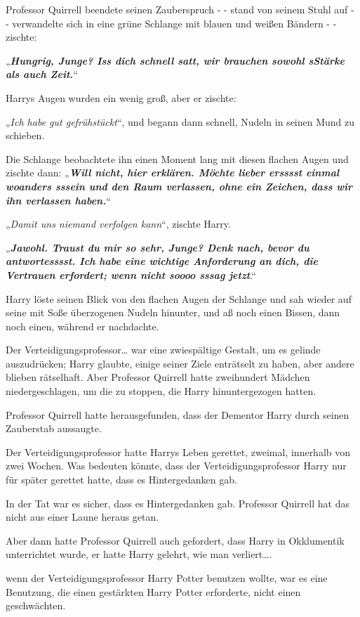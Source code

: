 {Professor Quirrell beendete seinen Zauberspruch - - stand von seinem Stuhl auf - - verwandelte sich in eine grüne Schlange mit blauen und weißen Bändern - - zischte:

„\textbf{\emph{Hungrig, Junge? Iss dich schnell satt, wir brauchen sowohl sStärke als auch Zeit.}}“

Harrys Augen wurden ein wenig groß, aber er zischte:

„\emph{Ich habe gut gefrühstückt}“, und begann dann schnell, Nudeln in seinen Mund zu schieben.

Die Schlange beobachtete ihn einen Moment lang mit diesen flachen Augen und zischte dann: „\textbf{\emph{Will nicht, hier erklären. Möchte lieber ersssst einmal woanders sssein und den Raum verlassen, ohne ein Zeichen, dass wir ihn verlassen haben.}}“

„\emph{Damit uns niemand verfolgen kann}“, zischte Harry.

„\textbf{\emph{Jawohl. Traust du mir so sehr, Junge? Denk nach, bevor du antwortesssst. Ich habe eine wichtige Anforderung an dich, die Vertrauen erfordert; wenn nicht soooo sssag jetzt}}.“

Harry löste seinen Blick von den flachen Augen der Schlange und sah wieder auf seine mit Soße überzogenen Nudeln hinunter, und aß noch einen Bissen, dann noch einen, während er nachdachte.

Der Verteidigungsprofessor… war eine zwiespältige Gestalt, um es gelinde auszudrücken; Harry glaubte, einige seiner Ziele enträtselt zu haben, aber andere blieben rätselhaft. Aber Professor Quirrell hatte zweihundert Mädchen niedergeschlagen, um die zu stoppen, die Harry hinuntergezogen hatten.

Professor Quirrell hatte herausgefunden, dass der Dementor Harry durch seinen Zauberstab aussaugte.

Der Verteidigungsprofessor hatte Harrys Leben gerettet, zweimal, innerhalb von zwei Wochen. Was bedeuten könnte, dass der Verteidigungsprofessor Harry nur für später gerettet hatte, dass es Hintergedanken gab.

In der Tat war es sicher, dass es Hintergedanken gab. Professor Quirrell hat das nicht aus einer Laune heraus getan.

Aber dann hatte Professor Quirrell auch gefordert, dass Harry in Okklumentik unterrichtet wurde, er hatte Harry gelehrt, wie man verliert….

wenn der Verteidigungsprofessor Harry Potter benutzen wollte, war es eine Benutzung, die einen gestärkten Harry Potter erforderte, nicht einen geschwächten.

}
